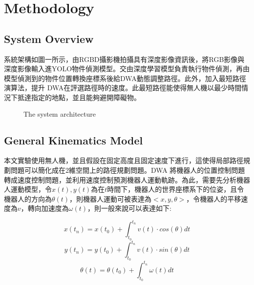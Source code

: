 \documentclass[crop=false]{standalone}
\begin{document}
	\section{Methodology}
	\subsection{System Overview}
	系統架構如圖一所示，由RGBD攝影機拍攝具有深度影像資訊後，將RGB影像與深度影像輸入進YOLO物件偵測模型。交由深度學習模型負責執行物件偵測，再由模型偵測到的物件位置轉換座標系後給DWA動態調整路徑。此外，加入最短路徑演算法，提升 DWA在評選路徑時的速度。此最短路徑能使得無人機以最少時間情況下抵達指定的地點，並且能夠避開障礙物。
	
	\begin{figure*}[thbp!]
		\centering
		\caption{The system architecture}
		\label{fig:system}
	\end{figure*}
	\subsection{General Kinematics Model}
	本文實驗使用無人機，並且假設在固定高度且固定速度下進行，這使得局部路徑規劃問題可以簡化成在2維空間上的路徑規劃問題。DWA 將機器人的位置控制問題轉成速度控制問題，並利用速度控制預測機器人運動軌跡。為此，需要先分析機器人運動模型\cite{fox}，令$x(t), y(t)$為在$t$時間下，機器人的世界座標系下的位姿，且令機器人的方向為$\theta(t)$，則機器人運動可被表達為$<x, y, \theta>$，令機器人的平移速度為$v$，轉向加速度為$\omega(t)$，則一般來說可以表達如下:
	
	\begin{equation}
		x(t_n)=x(t_0)+ \int_{t_0}^{t_n}v(t) \cdot cos(\theta)dt
	\end{equation}
	\begin{equation}
		y(t_n)=y(t_0)+ \int_{t_0}^{t_n}v(t) \cdot sin(\theta)dt
	\end{equation}
	\begin{equation}
		\theta(t)=\theta(t_0)+\int_{t_0}^{t_n}\omega(t)dt
	\end{equation}
	
	
\end{document}
